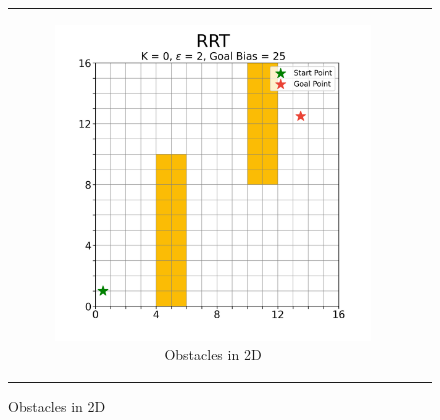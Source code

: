 
\begin{figure}[H]
\begin{centering}
\begin{tabular}{cc}

    \begin{subfigure}{0.5\linewidth}
    \includegraphics[width=\linewidth]{chapters/chapter2/img/visualizing/obstacles2d.png}
    \caption{Obstacles in 2D}
    \end{subfigure} &


\end{tabular}
\end{centering}
\end{figure}
